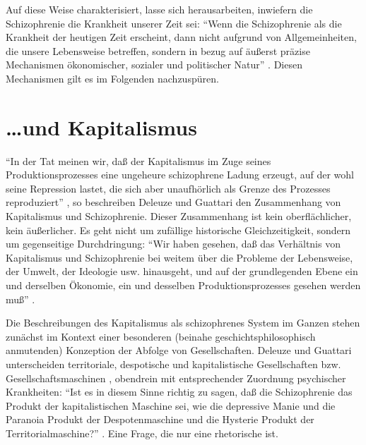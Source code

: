 \documentclass[12pt,
               paper=a4,
               twoside=false,
               onehalfspacing,
               bibliography=totoc,
               toc=graduated,
               ]{scrartcl}
\newcommand{\pc}[2]{\parencite[#1]{#2}}
\newcommand{\vgl}[2]{\parencite[vgl.][#1]{#2}}
\begin{document}
Auf diese Weise charakterisiert, lasse sich herausarbeiten, inwiefern
die Schizophrenie die Krankheit unserer Zeit sei: "`Wenn die
Schizophrenie als die Krankheit der heutigen Zeit erscheint, dann
nicht aufgrund von Allgemeinheiten, die unsere Lebensweise betreffen,
sondern in bezug auf äußerst präzise Mechanismen ökonomischer,
sozialer und politischer Natur"' \pc{28}{schizg}. Diesen Mechanismen
gilt es im Folgenden nachzuspüren.



\section{\dots und Kapitalismus}

"`In der Tat meinen wir, daß der Kapitalismus im Zuge seines
Produktionsprozesses eine ungeheure schizophrene Ladung erzeugt, auf
der wohl seine Repression lastet, die sich aber unaufhörlich als
Grenze des Prozesses reproduziert"' \pc{45}{ao}, so beschreiben
Deleuze und Guattari den Zusammenhang von Kapitalismus und
Schizophrenie. Dieser Zusammenhang ist kein oberflächlicher, kein
äußerlicher. Es geht nicht um zufällige historische Gleichzeitigkeit,
sondern um gegenseitige Durchdringung: "`Wir haben gesehen, daß das
Verhältnis von Kapitalismus und Schizophrenie bei weitem über die
Probleme der Lebensweise, der Umwelt, der Ideologie usw. hinausgeht,
und auf der grundlegenden Ebene ein und derselben Ökonomie, ein und
desselben Produktionsprozesses gesehen werden muß"' \pc{315}{ao}.

Die Beschreibungen des Kapitalismus als schizophrenes System im
Ganzen stehen zunächst im Kontext einer besonderen (beinahe
geschichtsphilosophisch anmutenden) Konzeption der Abfolge von
Gesellschaften. Deleuze und Guattari unterscheiden territoriale,
despotische und kapitalistische Gesellschaften bzw.
Gesellschaftsmaschinen \vgl{338}{ao}, obendrein mit entsprechender
Zuordnung psychischer Krankheiten: "`Ist es in diesem Sinne richtig zu
sagen, daß die Schizophrenie das Produkt der kapitalistischen Maschine
sei, wie die depressive Manie und die Paranoia Produkt der
Despotenmaschine und die Hysterie Produkt der Territorialmaschine?"'
\pc{44}{ao}. Eine Frage, die nur eine rhetorische ist.
\end{document}

